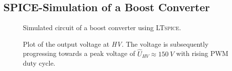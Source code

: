     \subsection{SPICE-Simulation of a Boost Converter}
        \begin{figure}[H]
            \centering
            
            \caption[Simulated circuit of a boost converter.]{Simulated circuit of a boost converter using \textsc{LTspice}.}
            \label{fig:simCircuit}
        \end{figure}
        \begin{figure}[H]
            \centering
            
            \caption[Simulated output voltages at various duty cycles]{Plot of the output voltage at \textit{HV}. The voltage is subsequently progressing towards a peak voltage of \( \hat{U}_{HV} \approx \SI{150}{V} \) with rising PWM duty cycle.}
            \label{fig:plotSimCircuit}
        \end{figure}
